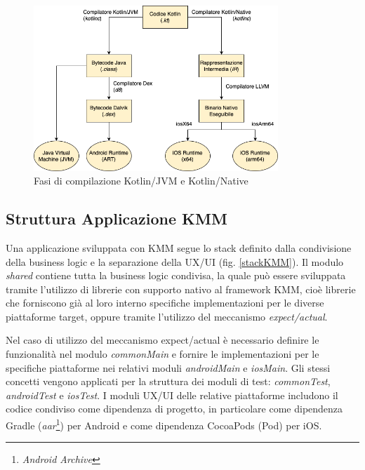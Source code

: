 \begin{figure}[H]
    \centering
    \includegraphics[width=0.82\textwidth]{img/compilatore_kotlin.png}
    \caption{Fasi di compilazione Kotlin/JVM e Kotlin/Native}
    \label{kotlin-native-compile}
\end{figure}

\subsection{Struttura Applicazione KMM}
Una applicazione sviluppata con KMM segue lo stack definito dalla condivisione della business logic e la separazione della UX/UI (fig. \ref{stackKMM}). Il modulo \textit{shared} contiene tutta la business logic condivisa, la quale può essere sviluppata tramite l'utilizzo di librerie con supporto nativo al framework KMM, cioè librerie che forniscono già al loro interno specifiche implementazioni per le diverse piattaforme target, oppure tramite l'utilizzo del meccanismo \textit{expect/actual}.

Nel caso di utilizzo del meccanismo expect/actual è necessario definire le funzionalità nel modulo \textit{commonMain} e fornire le implementazioni per le specifiche piattaforme nei relativi moduli \textit{androidMain} e \textit{iosMain}. Gli stessi concetti vengono applicati per la struttura dei moduli di test: \textit{commonTest}, \textit{androidTest} e \textit{iosTest}. I moduli UX/UI delle relative piattaforme includono il codice condiviso come dipendenza di progetto, in particolare come dipendenza Gradle (\textit{aar}\footnote{\textit{Android Archive}}) per Android e come dipendenza CocoaPods (Pod) per iOS.

